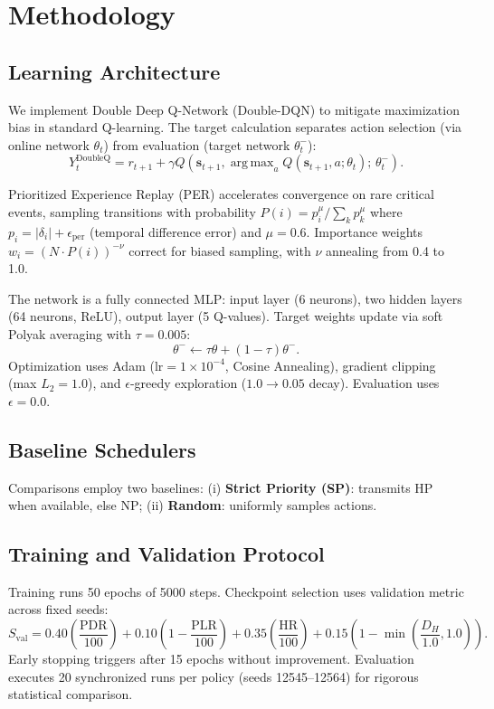 \documentclass[runningheads,a4paper]{llncs}
\begin{document}
\section{Methodology}

\subsection{Learning Architecture}
We implement Double Deep Q-Network (Double-DQN) to mitigate maximization bias in standard Q-learning. The target calculation separates action selection (via online network $\theta_t$) from evaluation (target network $\theta_t^{-}$):
\begin{equation}
Y_t^{\text{DoubleQ}} = r_{t+1} + \gamma Q\left(\mathbf{s}_{t+1}, \operatorname{arg\,max}_{a} Q(\mathbf{s}_{t+1}, a; \theta_t);\, \theta_t^{-}\right).
\end{equation}

Prioritized Experience Replay (PER) accelerates convergence on rare critical events, sampling transitions with probability $P(i) = p_i^\mu / \sum_k p_k^\mu$ where $p_i = |\delta_i| + \epsilon_{\text{per}}$ (temporal difference error) and $\mu = 0.6$. Importance weights $w_i = (N \cdot P(i))^{-\nu}$ correct for biased sampling, with $\nu$ annealing from 0.4 to 1.0.

The network is a fully connected MLP: input layer (6 neurons), two hidden layers (64 neurons, ReLU), output layer (5 Q-values). Target weights update via soft Polyak averaging with $\tau = 0.005$:
\begin{equation}
\theta^{-} \leftarrow \tau \theta + (1 - \tau)\theta^{-}.
\end{equation}
Optimization uses Adam ($\text{lr} = 1 \times 10^{-4}$, Cosine Annealing), gradient clipping (max $L_2 = 1.0$), and $\epsilon$-greedy exploration ($1.0 \to 0.05$ decay). Evaluation uses $\epsilon = 0.0$.

\subsection{Baseline Schedulers}
Comparisons employ two baselines: (i) \textbf{Strict Priority (SP)}: transmits HP when available, else NP; (ii) \textbf{Random}: uniformly samples actions.

\subsection{Training and Validation Protocol}
Training runs 50 epochs of 5000 steps. Checkpoint selection uses validation metric across fixed seeds:
\begin{equation}
S_{\text{val}} = 0.40 \left(\frac{\text{PDR}}{100}\right) + 0.10 \left(1 - \frac{\text{PLR}}{100}\right) + 0.35 \left(\frac{\text{HR}}{100}\right) + 0.15 \left(1 - \min\left(\frac{D_H}{1.0}, 1.0\right)\right).
\end{equation}
Early stopping triggers after 15 epochs without improvement. Evaluation executes 20 synchronized runs per policy (seeds 12545--12564) for rigorous statistical comparison.
\end{document}
